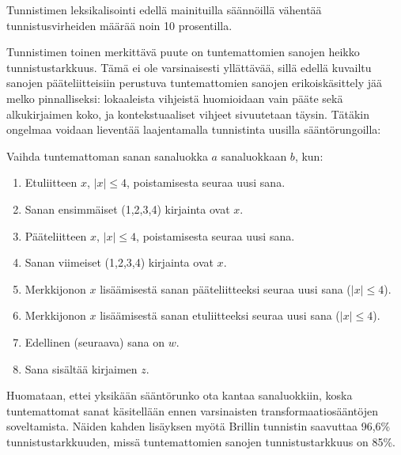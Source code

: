 \documentclass[utf8,bachelor,manualbib]{gradu3}
\begin{document}
Tunnistimen leksikalisointi edellä mainituilla säännöillä vähentää tunnistusvirheiden määrää noin 10 prosentilla. \citep{brill1994}

Tunnistimen toinen merkittävä puute on tuntemattomien sanojen heikko tunnistustarkkuus. Tämä ei ole varsinaisesti yllättävää, sillä edellä kuvailtu sanojen pääteliitteisiin perustuva tuntemattomien sanojen erikoiskäsittely jää melko pinnalliseksi: lokaaleista vihjeistä huomioidaan vain pääte sekä alkukirjaimen koko, ja kontekstuaaliset vihjeet sivuutetaan täysin. Tätäkin ongelmaa voidaan lieventää laajentamalla tunnistinta uusilla sääntörungoilla: 

Vaihda tuntemattoman sanan sanaluokka $a$ sanaluokkaan $b$, kun:
\begin{enumerate}
\item Etuliitteen $x$, $|x| \leq 4$, poistamisesta seuraa uusi sana.
\item Sanan ensimmäiset (1,2,3,4) kirjainta ovat $x$. 
\item Pääteliitteen $x$, $|x| \leq 4$, poistamisesta seuraa uusi sana.
\item Sanan viimeiset (1,2,3,4) kirjainta ovat $x$. 
\item Merkkijonon $x$ lisäämisestä sanan pääteliitteeksi seuraa uusi sana ($|x| \leq 4$).
\item Merkkijonon $x$ lisäämisestä sanan etuliitteeksi seuraa uusi sana ($|x| \leq 4$).
\item Edellinen (seuraava) sana on $w$.
\item Sana sisältää kirjaimen $z$.
\end{enumerate}

Huomataan, ettei yksikään sääntörunko ota kantaa sanaluokkiin, koska tuntemattomat sanat käsitellään ennen varsinaisten transformaatiosääntöjen soveltamista. Näiden kahden lisäyksen myötä Brillin tunnistin saavuttaa 96,6\% tunnistustarkkuuden, missä tuntemattomien sanojen tunnistustarkkuus on 85\%. \citep{brill1994, brill1995}
\end{document}
